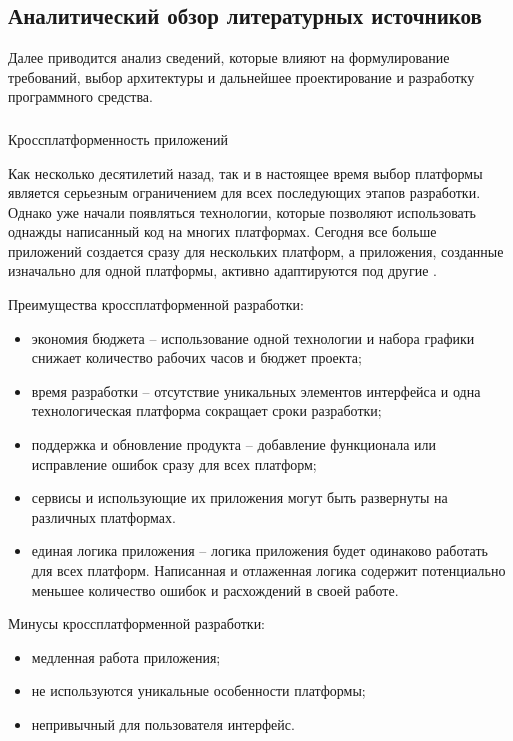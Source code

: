 \subsection{Аналитический обзор литературных источников}
\label{sec:analysis:literature}

Далее приводится анализ сведений, которые влияют на формулирование требований, выбор архитектуры и дальнейшее проектирование и разработку программного средства.

\subsubsection{} Кроссплатформенность приложений
\label{sec:analysis:literature:crossplatform}

Как несколько десятилетий назад, так и в настоящее время выбор платформы является серьезным ограничением для всех последующих этапов разработки. Однако уже начали появляться технологии, которые позволяют использовать однажды написанный код на многих платформах. Сегодня все больше приложений создается сразу для нескольких платформ, а приложения, созданные изначально для одной платформы, активно адаптируются под другие \cite{habr_crossplatform}. 

Преимущества кроссплатформенной разработки:

\begin{itemize}
	\item экономия бюджета – использование одной технологии и набора графики снижает количество рабочих часов и бюджет проекта;
	\item время разработки – отсутствие уникальных элементов интерфейса и одна технологическая платформа сокращает сроки разработки;
	\item поддержка и обновление продукта – добавление функционала или исправление ошибок сразу для всех платформ;
	\item сервисы и использующие их приложения могут быть развернуты на различных платформах.
	\item единая логика приложения – логика приложения будет одинаково работать для всех платформ. Написанная и отлаженная логика содержит потенциально меньшее количество ошибок и расхождений в своей работе.
\end{itemize}

Минусы кроссплатформенной разработки:

\begin{itemize}
	\item медленная работа приложения;
	\item не используются уникальные особенности платформы;
	\item непривычный для пользователя интерфейс.
\end{itemize}

